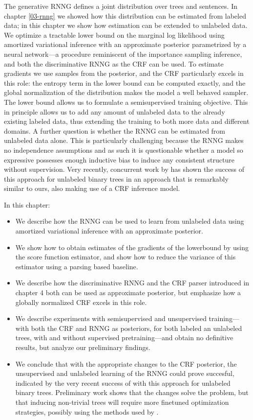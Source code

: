 The generative RNNG defines a joint distribution over trees and sentences. In chapter \ref{03-rnng} we showed how this distribution can be estimated from labeled data; in this chapter we show how estimation can be extended to unlabeled data. We optimize a tractable lower bound on the marginal log likelihood using amortized variational inference with an approximate posterior parametrized by a neural network---a procedure reminiscent of the importance sampling inference, and both the discriminative RNNG as the CRF can be used. To estimate gradients we use samples from the posterior, and the CRF particularly excels in this role: the entropy term in the lower bound can be computed exactly, and the global normalization of the distribution makes the model a well behaved sampler. The lower bound allows us to formulate a semisupervised training objective. This in principle allows us to add any amount of unlabeled data to the already existing labeled data, thus extending the training to both more data and different domains. A further question is whether the RNNG can be estimated from unlabeled data alone. This is particularly challenging because the RNNG makes no independence assumptions and as such it is questionable whether a model so expressive possesses enough inductive bias to induce any consistent structure without supervision. Very recently, concurrent work by \citet{kim2019unsupervised} has shown the success of this approach for unlabeled binary trees in an approach that is remarkably similar to ours, also making use of a CRF inference model.

In this chapter:
\begin{itemize}
  \item We describe how the RNNG can be used to learn from unlabeled data using amortized variational inference with an approximate posterior.
  \item We show how to obtain estimates of the gradients of the lowerbound by using the score function estimator, and show how to reduce the variance of this estimator using a parsing based baseline.
  \item We describe how the discriminative RNNG and the CRF parser introduced in chapter 4 both can be used as approximate posterior, but emphasize how a globally normalized CRF excels in this role.
  \item We describe experiments with semisupervised and unsupervised training---with both the CRF and RNNG as posteriors, for both labeled an unlabeled trees, with and without supervised pretraining---and obtain no definitive results, but analyze our preliminary findings.
  \item We conclude that with the appropriate changes to the CRF posterior, the unsupervised and unlabeled learning of the RNNG could prove succesful, indicated by the very recent success of \citet{kim2019unsupervised} with this approach for unlabeled binary trees. Preliminary work shows that the changes solve the problem, but that inducing non-trivial trees will require more finetuned optimization strategies, possibly using the methods used by \citet{kim2019unsupervised}.
\end{itemize}

